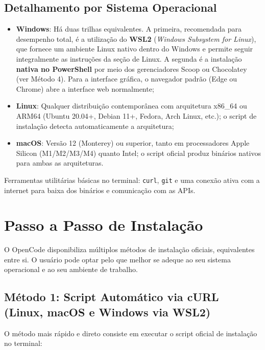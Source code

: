 \subsection{Detalhamento por Sistema Operacional}

\begin{itemize}
  \item \textbf{Windows}: H{\'a} duas trilhas equivalentes. A primeira, recomendada para desempenho total, {\'e} a utiliza{\c c}{\~a}o do \textbf{WSL2} (\emph{Windows Subsystem for Linux}), que fornece um ambiente Linux nativo dentro do Windows e permite seguir integralmente as instru{\c c}{\~o}es da se{\c c}{\~a}o de Linux. A segunda {\'e} a instala{\c c}{\~a}o \textbf{nativa no PowerShell} por meio dos gerenciadores Scoop ou Chocolatey (ver M{\'e}todo 4). Para a interface gr{\'a}fica, o navegador padr{\~a}o (Edge ou Chrome) abre a interface web normalmente;
  \item \textbf{Linux}: Qualquer distribui{\c c}{\~a}o contempor{\^a}nea com arquitetura x86\_64 ou ARM64 (Ubuntu 20.04+, Debian 11+, Fedora, Arch Linux, etc.); o script de instala{\c c}{\~a}o detecta automaticamente a arquitetura;
  \item \textbf{macOS}: Vers{\~a}o 12 (Monterey) ou superior, tanto em processadores Apple Silicon (M1/M2/M3/M4) quanto Intel; o script oficial produz bin{\'a}rios nativos para ambas as arquiteturas.
\end{itemize}

Ferramentas utilit{\'a}rias b{\'a}sicas no terminal: \texttt{curl}, \texttt{git} e uma conex{\~a}o ativa com a internet para baixa dos bin{\'a}rios e comunica{\c c}{\~a}o com as APIs.

\section{Passo a Passo de Instala{\c c}{\~a}o}

O OpenCode disponibiliza m{\'u}ltiplos m{\'e}todos de instala{\c c}{\~a}o oficiais, equivalentes entre si. O usu{\'a}rio pode optar pelo que melhor se adeque ao seu sistema operacional e ao seu ambiente de trabalho.

\subsection{M{\'e}todo 1: Script Autom{\'a}tico via cURL (Linux, macOS e Windows via WSL2)}

O m{\'e}todo mais r{\'a}pido e direto consiste em executar o script oficial de instala{\c c}{\~a}o no terminal:

